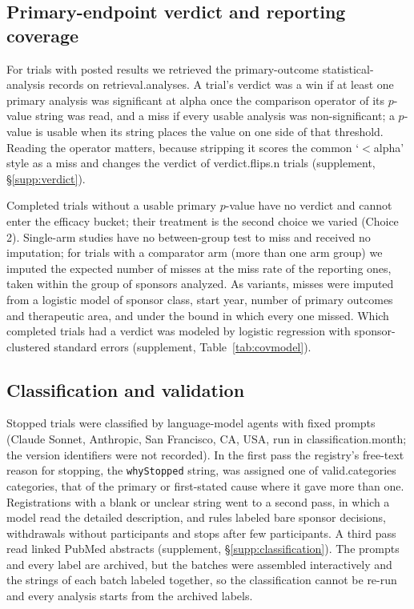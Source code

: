 \documentclass[preprint,11pt]{elsarticle}
\newcommand{\code}[1]{\texttt{\small #1}}
\begin{document}
\subsection{Primary-endpoint verdict and reporting coverage}\label{sec:verdict}
For trials with posted results we retrieved the primary-outcome statistical-analysis records on \num{retrieval.analyses}. A trial's verdict was a win if at least one primary analysis was significant at \num{alpha} once the comparison operator of its $p$-value string was read, and a miss if every usable analysis was non-significant; a $p$-value is usable when its string places the value on one side of that threshold. Reading the operator matters, because stripping it scores the common `$<$\num{alpha}' style as a miss and changes the verdict of \num{verdict.flips.n} trials (supplement, \S\ref{supp:verdict}).

Completed trials without a usable primary $p$-value have no verdict and cannot enter the efficacy bucket; their treatment is the second choice we varied (Choice 2). Single-arm studies have no between-group test to miss and received no imputation; for trials with a comparator arm (more than one arm group) we imputed the expected number of misses at the miss rate of the reporting ones, taken within the group of sponsors analyzed. As variants, misses were imputed from a logistic model of sponsor class, start year, number of primary outcomes and therapeutic area, and under the bound in which every one missed. Which completed trials had a verdict was modeled by logistic regression with sponsor-clustered standard errors (supplement, Table~\ref{tab:covmodel}).

\subsection{Classification and validation}\label{sec:classification}
Stopped trials were classified by language-model agents with fixed prompts (Claude Sonnet, Anthropic, San Francisco, CA, USA, run in \num{classification.month}; the version identifiers were not recorded). In the first pass the registry's free-text reason for stopping, the \code{whyStopped} string, was assigned one of \num{valid.categories} categories, that of the primary or first-stated cause where it gave more than one. Registrations with a blank or unclear string went to a second pass, in which a model read the detailed description, and rules labeled bare sponsor decisions, withdrawals without participants and stops after few participants. A third pass read linked PubMed abstracts (supplement, \S\ref{supp:classification}). The prompts and every label are archived, but the batches were assembled interactively and the strings of each batch labeled together, so the classification cannot be re-run and every analysis starts from the archived labels.
\end{document}
